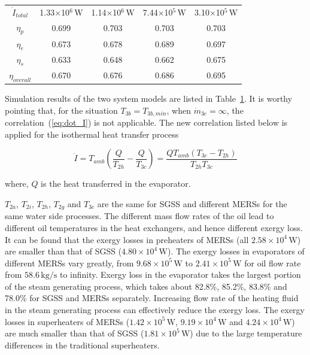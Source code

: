 \begin{table}[htbp]
\begin{center}
\begin{tabular}{ccccc}
		$\dot{I}_{total}$    &    1.33$\times$10$^6\,\mathrm{W}$    &  1.14$\times$10$^6\,\mathrm{W}$  &	7.44$\times$10$^5\,\mathrm{W}$	&	3.10$\times$10$^5\,\mathrm{W}$\\
		$\eta_p$    &    0.699    &	0.703	&    0.703	&	0.703\\
		$\eta_e$    &    0.673    &	0.678	& 0.689	&	0.697\\
		$\eta_s$    &    0.633    &  0.648	&  0.662	&	0.675\\
		$\eta_{overall}$    &    0.670   &	0.676	&    0.686	&	0.695\\
		\bottomrule
	\end{tabular}
	\end{center}
	\label{tab:comparison}
\end{table}

Simulation results of the two system models are listed in Table~\ref{tab:comparison}. 
It is worthy pointing that, for the situation $T_{3b} = T_{3b,min}$, when $\dot{m}_{3e} = \infty$, the correlation~(\ref{eq:dot_I}) is not applicable. The new correlation listed below is applied for the isothermal heat transfer process

\begin{equation}
  \dot{I} = T_{amb} (\frac{Q}{T_{2h}} - \frac{Q}{T_{3c}}) = \frac{QT_{amb}(T_{3c} - T_{2h})}{T_{2h}T_{3c}}
  \label{eq:isothermal}
\end{equation}

where, $Q$ is the heat transferred in the evaporator.

$T_{2a}$, $T_{2i}$, $T_{2h}$, $T_{2g}$ and $T_{3c}$ are the same for SGSS and different MERSs for the same water side processes. The different mass flow rates of the oil lead to different oil temperatures in the heat exchangers, and hence different exergy loss. It can be found that the exergy losses in preheaters of MERSs (all $2.58\times 10^4\,\mathrm{W}$) are smaller than that of SGSS ($4.80\times10^4\,\mathrm{W}$). The exergy losses in evaporators of different MERSs vary greatly, from $9.68\times10^5\,\mathrm{W}$ to $2.41\times10^5\,\mathrm{W}$ for oil flow rate from $58.6\,\mathrm{kg/s}$ to infinity.
Exergy loss in the evaporator takes the largest portion of the steam generating process, which takes about 82.8\%, 85.2\%, 83.8\% and 78.0\% for SGSS and MERSs separately.
Increasing flow rate of the heating fluid in the steam generating process can effectively reduce the exergy loss.
The exergy losses in superheaters of MERSs ($1.42\times 10^5\,\mathrm{W}$, $9.19\times 10^4\,\mathrm{W}$ and $4.24\times 10^4\,\mathrm{W}$) are much smaller than that of SGSS ($1.81\times10^5\,\mathrm{W}$) due to the large temperature differences in the traditional superheaters.

